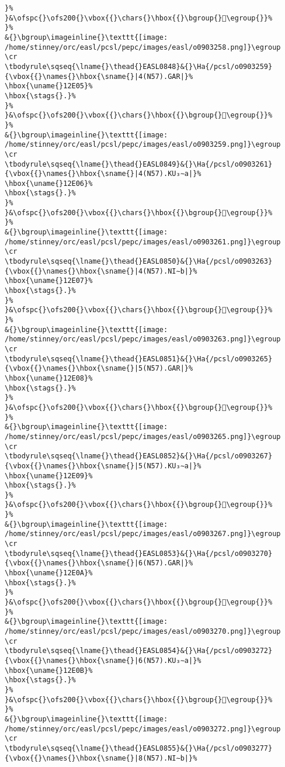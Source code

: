 \begin{verbatim}
}%
}&\ofspc{}\ofs200{}\vbox{{}\chars{}\hbox{{}\bgroup{}𒸄\egroup{}}%
}%
&{}\bgroup\imageinline{}\texttt{[image: /home/stinney/orc/easl/pcsl/pepc/images/easl/o0903258.png]}\egroup
\cr
\tbodyrule\sqseq{\lname{}\thead{}EASL0848}&{}\Ha{/pcsl/o0903259}{\vbox{{}\names{}\hbox{\sname{}|4(N57).GAR|}%
\hbox{\uname{}12E05}%
\hbox{\stags{}.}%
}%
}&\ofspc{}\ofs200{}\vbox{{}\chars{}\hbox{{}\bgroup{}𒸅\egroup{}}%
}%
&{}\bgroup\imageinline{}\texttt{[image: /home/stinney/orc/easl/pcsl/pepc/images/easl/o0903259.png]}\egroup
\cr
\tbodyrule\sqseq{\lname{}\thead{}EASL0849}&{}\Ha{/pcsl/o0903261}{\vbox{{}\names{}\hbox{\sname{}|4(N57).KU₃∼a|}%
\hbox{\uname{}12E06}%
\hbox{\stags{}.}%
}%
}&\ofspc{}\ofs200{}\vbox{{}\chars{}\hbox{{}\bgroup{}𒸆\egroup{}}%
}%
&{}\bgroup\imageinline{}\texttt{[image: /home/stinney/orc/easl/pcsl/pepc/images/easl/o0903261.png]}\egroup
\cr
\tbodyrule\sqseq{\lname{}\thead{}EASL0850}&{}\Ha{/pcsl/o0903263}{\vbox{{}\names{}\hbox{\sname{}|4(N57).NI∼b|}%
\hbox{\uname{}12E07}%
\hbox{\stags{}.}%
}%
}&\ofspc{}\ofs200{}\vbox{{}\chars{}\hbox{{}\bgroup{}𒸇\egroup{}}%
}%
&{}\bgroup\imageinline{}\texttt{[image: /home/stinney/orc/easl/pcsl/pepc/images/easl/o0903263.png]}\egroup
\cr
\tbodyrule\sqseq{\lname{}\thead{}EASL0851}&{}\Ha{/pcsl/o0903265}{\vbox{{}\names{}\hbox{\sname{}|5(N57).GAR|}%
\hbox{\uname{}12E08}%
\hbox{\stags{}.}%
}%
}&\ofspc{}\ofs200{}\vbox{{}\chars{}\hbox{{}\bgroup{}𒸈\egroup{}}%
}%
&{}\bgroup\imageinline{}\texttt{[image: /home/stinney/orc/easl/pcsl/pepc/images/easl/o0903265.png]}\egroup
\cr
\tbodyrule\sqseq{\lname{}\thead{}EASL0852}&{}\Ha{/pcsl/o0903267}{\vbox{{}\names{}\hbox{\sname{}|5(N57).KU₃∼a|}%
\hbox{\uname{}12E09}%
\hbox{\stags{}.}%
}%
}&\ofspc{}\ofs200{}\vbox{{}\chars{}\hbox{{}\bgroup{}𒸉\egroup{}}%
}%
&{}\bgroup\imageinline{}\texttt{[image: /home/stinney/orc/easl/pcsl/pepc/images/easl/o0903267.png]}\egroup
\cr
\tbodyrule\sqseq{\lname{}\thead{}EASL0853}&{}\Ha{/pcsl/o0903270}{\vbox{{}\names{}\hbox{\sname{}|6(N57).GAR|}%
\hbox{\uname{}12E0A}%
\hbox{\stags{}.}%
}%
}&\ofspc{}\ofs200{}\vbox{{}\chars{}\hbox{{}\bgroup{}𒸊\egroup{}}%
}%
&{}\bgroup\imageinline{}\texttt{[image: /home/stinney/orc/easl/pcsl/pepc/images/easl/o0903270.png]}\egroup
\cr
\tbodyrule\sqseq{\lname{}\thead{}EASL0854}&{}\Ha{/pcsl/o0903272}{\vbox{{}\names{}\hbox{\sname{}|6(N57).KU₃∼a|}%
\hbox{\uname{}12E0B}%
\hbox{\stags{}.}%
}%
}&\ofspc{}\ofs200{}\vbox{{}\chars{}\hbox{{}\bgroup{}𒸋\egroup{}}%
}%
&{}\bgroup\imageinline{}\texttt{[image: /home/stinney/orc/easl/pcsl/pepc/images/easl/o0903272.png]}\egroup
\cr
\tbodyrule\sqseq{\lname{}\thead{}EASL0855}&{}\Ha{/pcsl/o0903277}{\vbox{{}\names{}\hbox{\sname{}|8(N57).NI∼b|}%

\end{verbatim}
